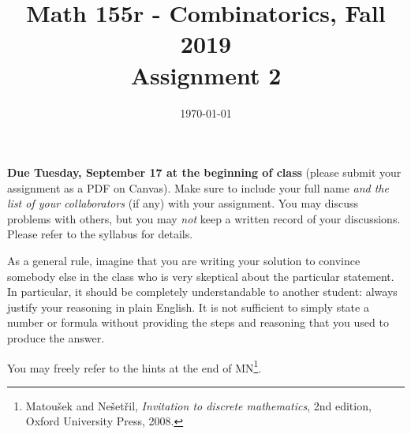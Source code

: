 \documentclass{amsart}
\title[Math 155r, Fall 2019: assignment 2]{Math 155r - Combinatorics, Fall 2019 \\ Assignment 2}
\date{\today}
\theoremstyle{definition}
\begin{document}

\vspace*{-10em}
\maketitle

\textbf{Due Tuesday, September 17 at the beginning of class} (please submit your assignment as a PDF on Canvas). Make sure to include your full name \emph{and the list of your collaborators} (if any) with your assignment. You may discuss problems with others, but you may \emph{not} keep a written record of your discussions. Please refer to the syllabus for details.

As a general rule, imagine that you are writing your solution to convince somebody else in the class who is very skeptical about the particular statement. In particular, it should be completely understandable to another student: always justify your reasoning in plain English. It is not sufficient to simply state a number or formula without providing the steps and reasoning that you used to produce the answer.

You may freely refer to the hints at the end of MN\footnote{Matoušek and Nešetřil, \emph{Invitation to discrete mathematics}, 2nd edition, Oxford University Press, 2008.}.
\end{document}
